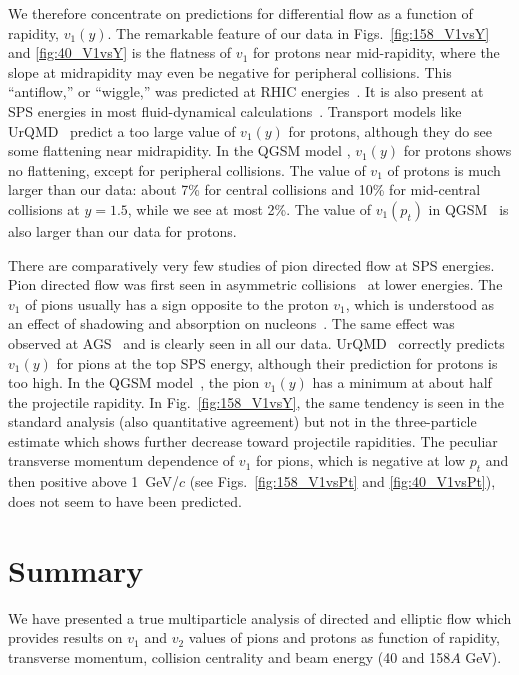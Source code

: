 \documentclass[aps,prc,superscriptaddress,showpacs,floatfix,nofootinbib]{revtex4}
\begin{document}
We therefore concentrate on predictions for differential flow as a
function of rapidity, $v_1(y)$.  The remarkable feature of our data in
Figs.~\ref{fig:158_V1vsY} and \ref{fig:40_V1vsY} is the flatness of
$v_1$ for protons near mid-rapidity, where the slope at midrapidity
may even be negative for peripheral collisions.  This ``antiflow,'' or
``wiggle,'' was predicted at RHIC energies~\cite{Snellings:1999bt}. It
is also present at SPS energies in most fluid-dynamical
calculations~\cite{Brachmann:1999xt,Csernai:1999nf,Ivanov:2000dr}.
Transport models like UrQMD~\cite{Soff:1999yg} predict a too large
value of $v_1(y)$ for protons, although they do see some flattening
near midrapidity.  In the QGSM model \cite{Bravina:2000dg}, $v_1(y)$
for protons shows no flattening, except for peripheral collisions. The
value of $v_1$ of protons is much larger than our data: about 7\% for
central collisions and 10\% for mid-central collisions at $y=1.5$,
while we see at most 2\%.  The value of $v_1(p_t)$ in
QGSM~\cite{Zabrodin:2000xc} is also larger than our data for protons.

There are comparatively very few studies of pion directed flow at SPS
energies.  Pion directed flow was first seen in asymmetric
collisions~\cite{Gosset:1988cm} at lower energies.  The $v_1$ of pions
usually has a sign opposite to the proton $v_1$, which is understood
as an effect of shadowing and absorption on
nucleons~\cite{Bass:em,Li:tj}.  The same effect was observed at
AGS~\cite{Barrette:1996rs} and is clearly seen in all our data.
UrQMD~\cite{Soff:1999yg} correctly predicts $v_1(y)$ for pions at the
top SPS energy, although their prediction for protons is too high.  In
the QGSM model~\cite{Bravina:2000dg}, the pion $v_1(y)$ has a minimum
at about half the projectile rapidity.  In Fig.~\ref{fig:158_V1vsY},
the same tendency is seen in the standard analysis (also quantitative
agreement) but not in the three-particle estimate which shows further
decrease toward projectile rapidities.  The peculiar transverse
momentum dependence of $v_1$ for pions, which is negative at low $p_t$
and then positive above 1~GeV/$c$ (see Figs.~\ref{fig:158_V1vsPt} and
\ref{fig:40_V1vsPt}), does not seem to have been predicted.


\section{Summary}
\label{s:summary}

We have presented a true multiparticle analysis of directed and
elliptic flow which provides results on $v_1$ and $v_2$ values of
pions and protons as function of rapidity, transverse momentum,
collision centrality and beam energy (40 and 158$A$ GeV).
\end{document}
